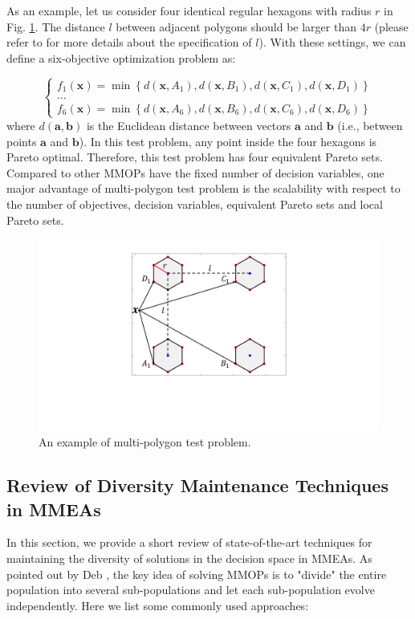 \documentclass[conference]{IEEEtran}
\begin{document}
As an example, let us consider four identical regular hexagons with radius $r$ in Fig. \ref{fig:Multi-Polygon Problem}. The distance $l$ between adjacent polygons should be larger than $4r$ (please refer to \cite{ishibuchi2019salable} for more details about the specification of $l$). With these settings, we can define a six-objective optimization problem as:

\begin{equation*}
\left\{
\begin{array}{c}{f_{1}(\boldsymbol{x})=\min \left\{d\left(\boldsymbol{x}, A_{1}\right), d\left(\boldsymbol{x}, B_{1}\right), d\left(\boldsymbol{x}, C_{1}\right), d\left(\boldsymbol{x}, D_{1}\right)\right\}} \\ \dots \\ {{f_{6}}(\boldsymbol{x})=\min \left\{d\left(\boldsymbol{x}, A_{6}\right), d\left(\boldsymbol{x}, B_{6}\right), d\left(\boldsymbol{x}, C_{6}\right), d\left(\boldsymbol{x}, D_{6}\right)\right\}}\end{array}
\right.
\end{equation*}
where $d(\boldsymbol{a} ,\boldsymbol{b})$ is the Euclidean distance between vectors $\boldsymbol{a}$ and $\boldsymbol{b}$ (i.e., between points $\boldsymbol{a}$ and $\boldsymbol{b}$). In this test problem, any point inside the four hexagons is Pareto optimal. Therefore, this test problem has four equivalent Pareto sets. Compared to other MMOPs have the fixed number of decision variables, one major advantage of multi-polygon test problem is the scalability with respect to the number of objectives, decision variables, equivalent Pareto sets and local Pareto sets\cite{ishibuchi2019salable}.

\begin{figure}[htbp]
	\centering
	\includegraphics[width=.25\textwidth]{Section2/Problem}
	\caption{An example of multi-polygon test problem.}
	\label{fig:Multi-Polygon Problem}
\end{figure}

\subsection{Review of Diversity Maintenance Techniques in MMEAs}
\label{Review of State-of-the-art Techniques}
In this section, we provide a short review of state-of-the-art techniques for maintaining the diversity of solutions in the decision space in MMEAs. As pointed out by Deb \cite{deb2001multi}, the key idea of solving MMOPs is to "divide" the entire population into several sub-populations and let each sub-population evolve independently. Here we list some commonly used approaches:
\end{document}
